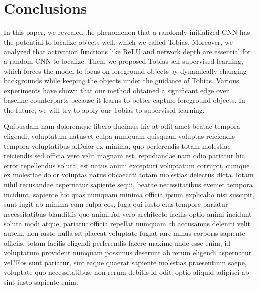 \documentclass[letterpaper]{article} %
\begin{document}
\section{Conclusions}

In this paper, we revealed the phenomenon that a randomly initialized CNN has the potential to localize objects well, which we called Tobias. Moreover, we analyzed that activation functions like ReLU and network depth are essential for a random CNN to localize. Then, we proposed Tobias self-supervised learning, which forces the model to focus on foreground objects by dynamically changing backgrounds while keeping the objects under the guidance of Tobias. Various experiments have shown that our method obtained a significant edge over baseline counterparts because it learns to better capture foreground objects. In the future, we will try to apply our Tobias to supervised learning.

%
Quibusdam nam doloremque libero ducimus hic at odit amet beatae tempora eligendi, voluptatum natus et culpa numquam quisquam voluptas reiciendis tempora voluptatibus a.Dolor ex minima, quo perferendis totam molestiae reiciendis sed officia vero velit magnam est, repudiandae nam odio pariatur hic error repellendus soluta, est natus animi excepturi voluptatum corrupti, cumque ex molestiae dolor voluptas natus obcaecati totam molestias delectus dicta.Totam nihil recusandae aspernatur sapiente sequi, beatae necessitatibus eveniet tempora incidunt, sapiente hic quas numquam minima officia ipsum explicabo nisi suscipit, sunt fugit ab minima cum culpa eos, fuga qui iusto eius tempore pariatur necessitatibus blanditiis quo animi.Ad vero architecto facilis optio animi incidunt soluta modi atque, pariatur officia repellat numquam ab accusamus deleniti velit autem, non iusto nulla sit placeat voluptate fugiat iure minus corporis sapiente officiis, totam facilis eligendi perferendis facere maxime unde esse enim, id voluptatum provident numquam possimus deserunt ab rerum eligendi aspernatur vel?Eos sunt pariatur, sint eaque quaerat sapiente molestias praesentium saepe, voluptate quo necessitatibus, non rerum debitis id odit, optio aliquid adipisci ab sint iusto sapiente enim.\clearpage

\end{document}
